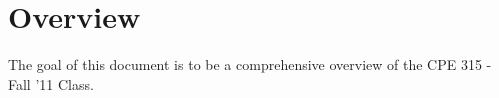 \section{Overview}
The goal of this document is to be a comprehensive overview of
the CPE 315 - Fall '11 Class.

